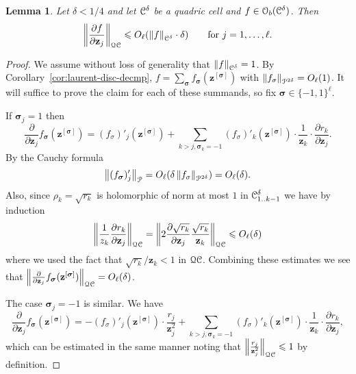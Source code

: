 \documentclass[reqno]{amsart}
\newtheorem{Lem}[Cor]{Lemma}{\bfseries}{\itshape}
\renewcommand\~[1]{\widetilde{#1}}
\def\pd#1#2{\frac{\partial#1}{\partial#2}}
\def\cP{{\mathcal P}} \def\cR{{\mathcal R}}
\def\O{\mathcal{O}}
\def\vz{{\mathbf z}}
\def\vsigma{{\boldsymbol\sigma}}
\def\vsigma{{\boldsymbol\sigma}}
\def\Qua{\mathcal{Q}}
\begin{document}
\begin{Lem}\label{lem:QC-derivative-bound}
  Let $\delta<1/4$ and let ${\mathcal C}^\delta$ be a quadric cell and
  $f\in\O_b(\cC^\delta)$. Then
  \begin{equation}
    \norm{\pd f{\vz_j}}_{\Qua\cC} \le O_\ell(\norm{f}_{\cC^\delta}\cdot\delta)
    \qquad \text{for }j=1,\ldots,\ell.
  \end{equation} 
\end{Lem}
\begin{proof}
  We assume without loss of generality that $\left\Vert f \right\Vert_{{\mathcal C}^\delta}=1$.
  By Corollary~\ref{cor:laurent-disc-decmp},
  $f=\sum_\vsigma f_\vsigma(\vz^{[\vsigma]})$ with
  $\norm{f_\sigma}_{\cP^{2\delta}}=O_\ell(1)$. It will suffice to prove
  the claim for each of these summands, so fix
  $\vsigma\in\{-1,1\}^\ell$.

  If $\vsigma_j=1$ then
  \begin{equation}
    \pd{}{\vz_j} f_\vsigma(\vz^{[\vsigma]}) = (f_\sigma)'_j(\vz^{[\vsigma]}) +
    \sum_{k>j,\vsigma_k=-1} (f_\sigma)'_k(\vz^{[\vsigma]})\cdot \frac{1}{\vz_k}\cdot\pd{r_k}{\vz_j}.
  \end{equation}
  By the Cauchy formula
  \begin{equation}
    \norm{(f_\vsigma)'_j}_\cP=O_\ell(\delta \norm{f_\sigma}_{\cP^{2\delta}})=O_\ell(\delta).
  \end{equation}
  Also, since $\rho_k=\sqrt{r_k}$ is holomorphic of norm at most $1$
  in ${\mathcal C}_{1..k-1}^\delta$ we have by induction
  \begin{equation}
    \norm{\frac{1}{z_k} \pd{r_k}{\vz_j}}_{\Qua\cC} = \norm{ 2 \pd{\sqrt{r_k}}{\vz_j} \frac{\sqrt{r_k}}{\vz_k}}_{\Qua\cC}\le
    O_\ell(\delta)
  \end{equation}
  where we used the fact that $\sqrt{r_k}/\vz_k<1$ in $\Qua\cC$.
  Combining these estimates we see that
  $\norm{\pd{}{\vz_j} f_\vsigma(\vz^{[\vsigma]})}_{\Qua\cC}=O_\ell(\delta)$.

  The case $\vsigma_j=-1$ is similar. We have
  \begin{equation}
    \pd{}{\vz_j} f_\vsigma(\vz^{[\vsigma]}) = -(f_\sigma)'_j(\vz^{[\vsigma]})\cdot\frac{r_j}{\vz_j^2} +
    \sum_{k>j,\vsigma_k=-1} (f_\sigma)'_k(\vz^{[\vsigma]})\cdot \frac{1}{\vz_k}\cdot\pd{r_k}{\vz_j},
  \end{equation}
  which can be estimated in the same manner noting that
  $\norm{\frac{r_j}{\vz_j^2}}_{\Qua\cC}\le 1$ by definition.
\end{proof}
\end{document}
